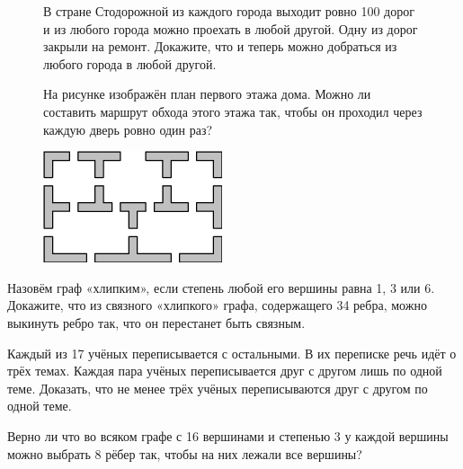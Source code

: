 \begin{figure}[H]
\begin{minipage}{0.69\linewidth}\setlength{\parindent}{1.5em}
    \begin{thm}
    В стране Стодорожной из каждого города выходит ровно 100 дорог и из любого города можно проехать в любой другой. Одну из дорог закрыли на ремонт. Докажите, что и теперь можно добраться из любого города в любой другой.
    \end{thm}
    \begin{thm}
        На рисунке изображён план первого этажа дома. Можно ли составить маршрут обхода этого этажа так, чтобы он проходил через каждую дверь ровно один раз?
    \end{thm}
\end{minipage}
\hfill
\begin{minipage}{0.3\linewidth}
\includegraphics[width=0.95\columnwidth]{img/10.3 staircase.png}
\end{minipage}
\end{figure}

\begin{thm}
    Назовём граф «хлипким», если степень любой его вершины равна 1, 3 или 6. Докажите, что из связного «хлипкого» графа, содержащего 34 ребра, можно выкинуть ребро так, что он перестанет быть связным.
\end{thm}

\begin{thm}
    Каждый из 17 учёных переписывается с остальными. В их переписке речь идёт о трёх темах. Каждая пара учёных переписывается друг с другом лишь по одной теме. Доказать, что не менее трёх учёных переписываются друг с другом по одной теме.
\end{thm}

\begin{thm}
    Верно ли что во всяком графе с 16 вершинами и степенью 3 у каждой вершины можно выбрать 8 рёбер так, чтобы на них лежали все вершины?
\end{thm}